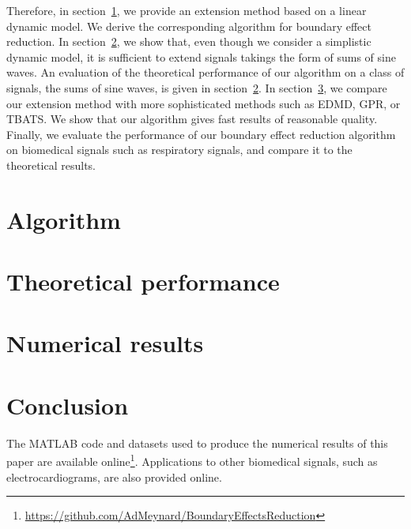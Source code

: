 \documentclass[journal]{IEEEtran}
\begin{document}
Therefore, in section~\ref{se:algo}, we provide an extension method based on a linear dynamic model. We derive the corresponding algorithm for boundary effect reduction. In section~\ref{se:theoretical}, we show that, even though we consider a simplistic dynamic model, it is sufficient to extend signals takings the form of sums of sine waves. An evaluation of the theoretical performance of our algorithm on a class of signals, the sums of sine waves, is given in section~\ref{se:theoretical}. In section~\ref{se:results}, we compare our extension method with more sophisticated methods such as EDMD, GPR, or TBATS. We show that our algorithm gives fast results of reasonable quality. Finally, we evaluate the performance of our boundary effect reduction algorithm on biomedical signals such as respiratory signals, and compare it to the theoretical results. 

\section{Algorithm}
\label{se:algo}



\section{Theoretical performance}
\label{se:theoretical}


\section{Numerical results}
\label{se:results}


{\color{red}
\section{Conclusion}
\label{se:conclusion}
The MATLAB code and datasets used to produce the numerical results of this paper are available online\footnote{\url{https://github.com/AdMeynard/BoundaryEffectsReduction}}. Applications to other biomedical signals, such as electrocardiograms, are also provided online. 
}

%





%
\end{document}

